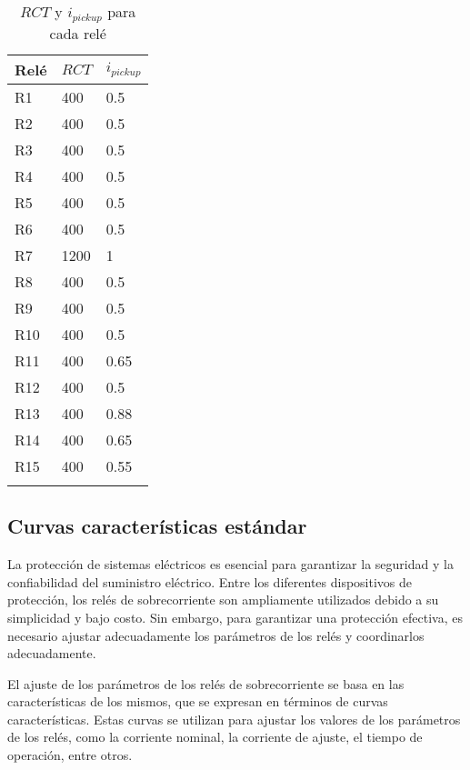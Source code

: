 \documentclass[journal,article,submit,pdftex,moreauthors]{Definitions/mdpi}
\begin{document}
\begin{table}[H]

\caption{$RCT$ y $i_{pickup}$ para cada relé} 
\begin{tabularx}{\textwidth}{CCC}

\toprule
\textbf{Relé} & \textbf{$RCT$}  & \textbf{$i_{pickup}$}\\ 
\midrule
R1   & 400 & 0.5\\
R2   & 400 & 0.5\\
R3   & 400 & 0.5\\
R4   & 400 & 0.5\\
R5   & 400 & 0.5\\
R6   & 400 & 0.5\\
R7   & 1200 & 1\\
R8   & 400 & 0.5\\
R9   & 400 & 0.5\\
R10   & 400 & 0.5\\
R11   & 400 & 0.65\\
R12   & 400 & 0.5\\
R13   & 400 & 0.88\\
R14   & 400 & 0.65\\
R15   & 400 & 0.55\\
\bottomrule

\label{tab_RCT}
\end{tabularx}
\end{table}

\subsection{Curvas características estándar}

La protección de sistemas eléctricos es esencial para garantizar la seguridad y la confiabilidad del suministro eléctrico. Entre los diferentes dispositivos de protección, los relés de sobrecorriente son ampliamente utilizados debido a su simplicidad y bajo costo. Sin embargo, para garantizar una protección efectiva, es necesario ajustar adecuadamente los parámetros de los relés y coordinarlos adecuadamente.

El ajuste de los parámetros de los relés de sobrecorriente se basa en las características de los mismos, que se expresan en términos de curvas características. Estas curvas se utilizan para ajustar los valores de los parámetros de los relés, como la corriente nominal, la corriente de ajuste, el tiempo de operación, entre otros.
\end{document}
